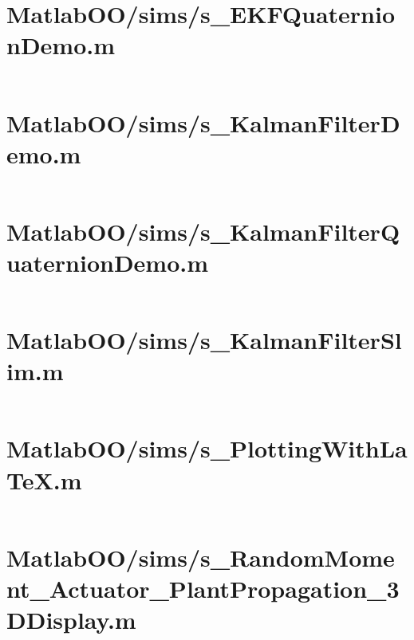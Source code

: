\pagebreak
\section{MatlabOO/sims/s\_EKFQuaternionDemo.m}\label{code:MatlabOO/sims/s_EKFQuaternionDemo.m}
\inputminted[linenos,fontsize=\scriptsize]{matlab}{/home/dcouture/git/mathyourlife/TSatPy/beta_versions/matlab_object_oriented/sims/s_EKFQuaternionDemo.m}

\pagebreak
\section{MatlabOO/sims/s\_KalmanFilterDemo.m}\label{code:MatlabOO/sims/s_KalmanFilterDemo.m}
\inputminted[linenos,fontsize=\scriptsize]{matlab}{/home/dcouture/git/mathyourlife/TSatPy/beta_versions/matlab_object_oriented/sims/s_KalmanFilterDemo.m}

\pagebreak
\section{MatlabOO/sims/s\_KalmanFilterQuaternionDemo.m}\label{code:MatlabOO/sims/s_KalmanFilterQuaternionDemo.m}
\inputminted[linenos,fontsize=\scriptsize]{matlab}{/home/dcouture/git/mathyourlife/TSatPy/beta_versions/matlab_object_oriented/sims/s_KalmanFilterQuaternionDemo.m}

\pagebreak
\section{MatlabOO/sims/s\_KalmanFilterSlim.m}\label{code:MatlabOO/sims/s_KalmanFilterSlim.m}
\inputminted[linenos,fontsize=\scriptsize]{matlab}{/home/dcouture/git/mathyourlife/TSatPy/beta_versions/matlab_object_oriented/sims/s_KalmanFilterSlim.m}

\pagebreak
\section{MatlabOO/sims/s\_PlottingWithLaTeX.m}\label{code:MatlabOO/sims/s_PlottingWithLaTeX.m}
\inputminted[linenos,fontsize=\scriptsize]{matlab}{/home/dcouture/git/mathyourlife/TSatPy/beta_versions/matlab_object_oriented/sims/s_PlottingWithLaTeX.m}

\pagebreak
\section{MatlabOO/sims/s\_RandomMoment\_Actuator\_PlantPropagation\_3DDisplay.m}\label{code:MatlabOO/sims/s_RandomMoment_Actuator_PlantPropagation_3DDisplay.m}
\inputminted[linenos,fontsize=\scriptsize]{matlab}{/home/dcouture/git/mathyourlife/TSatPy/beta_versions/matlab_object_oriented/sims/s_RandomMoment_Actuator_PlantPropagation_3DDisplay.m}

